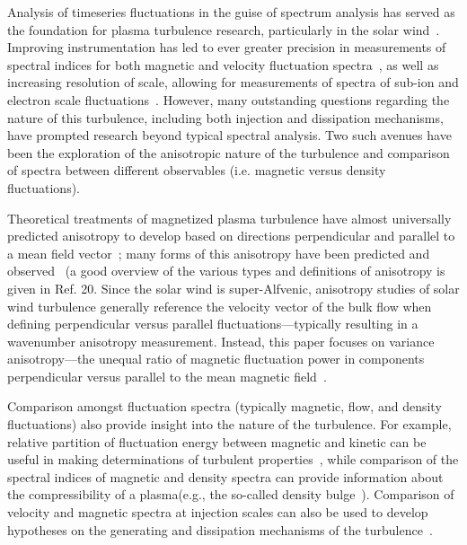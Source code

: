 \documentclass[aip,prl,amsmath,amssymb,reprint,superscriptaddress]{revtex4-1} %
\begin{document}

Analysis of timeseries fluctuations in the guise of spectrum analysis has served as the foundation for plasma turbulence research, particularly in the solar wind~\cite{goldstein95,tumarsch95}. Improving instrumentation has led to ever greater precision in measurements of spectral indices for both magnetic and velocity fluctuation spectra~\cite{podesta07}, as well as increasing resolution of scale, allowing for measurements of spectra of sub-ion and electron scale fluctuations~\cite{yordanova08,alexandrova09,sahraoui09,chen13}. However, many outstanding questions regarding the nature of this turbulence, including both injection and dissipation mechanisms, have prompted research beyond typical spectral analysis. Two such avenues have been the exploration of the anisotropic nature of the turbulence and comparison of spectra between different observables (i.e. magnetic versus density fluctuations).

Theoretical treatments of magnetized plasma turbulence have almost universally predicted anisotropy to develop based on directions perpendicular and parallel to a mean field vector~\cite{montgomery81,matthaeus90,goldreich95,zhou04,boldyrev06}; many forms of this anisotropy have been predicted and observed~\cite{dasso05,horbury08,podesta09,perri09,wicks10,he11} (a good overview of the various types and definitions of anisotropy is given in Ref. 20. Since the solar wind is super-Alfvenic, anisotropy studies of solar wind turbulence generally reference the velocity vector of the bulk flow when defining perpendicular versus parallel fluctuations---typically resulting in a wavenumber anisotropy measurement. Instead, this paper focuses on variance anisotropy---the unequal ratio of magnetic fluctuation power in components perpendicular versus parallel to the mean magnetic field~\cite{belcher71,smith06}.

Comparison amongst fluctuation spectra (typically magnetic, flow, and density fluctuations) also provide insight into the nature of the turbulence. For example, relative partition of fluctuation energy between magnetic and kinetic can be useful in making determinations of turbulent properties~\cite{podesta07}, while comparison of the spectral indices of magnetic and density spectra can provide information about the compressibility of a plasma(e.g., the so-called density bulge~\cite{coles89,harmon05}). Comparison of velocity and magnetic spectra at injection scales can also be used to develop hypotheses on the generating and dissipation mechanisms of the turbulence~\cite{roberts10}.
\end{document}
